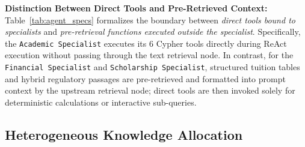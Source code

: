 \begin{table}[!htbp]
\centering
\caption{Operational comparison and resource privileges of domain-specialized agents in \system{}.}
\label{tab:agent_specs}
\end{table}

\textbf{Distinction Between Direct Tools and Pre-Retrieved Context:} Table~\ref{tab:agent_specs} formalizes the boundary between \emph{direct tools bound to specialists} and \emph{pre-retrieval functions executed outside the specialist}. Specifically, the \texttt{Academic Specialist} executes its 6 Cypher tools directly during ReAct execution without passing through the text retrieval node. In contrast, for the \texttt{Financial Specialist} and \texttt{Scholarship Specialist}, structured tuition tables and hybrid regulatory passages are pre-retrieved and formatted into prompt context by the upstream retrieval node; direct tools are then invoked solely for deterministic calculations or interactive sub-queries.

\subsection{Heterogeneous Knowledge Allocation}
\label{sec:allocation}

